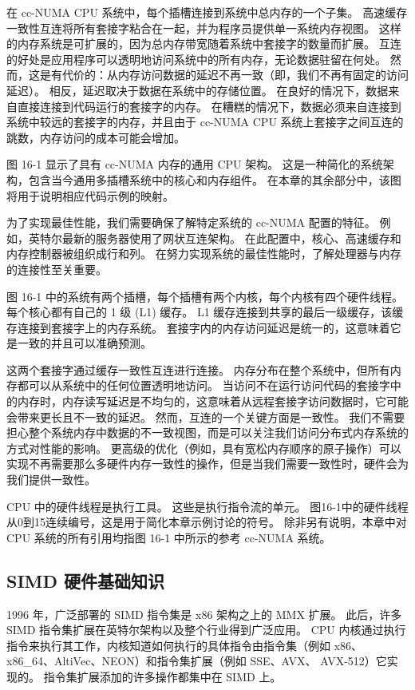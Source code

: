 在 cc-NUMA CPU 系统中，每个插槽连接到系统中总内存的一个子集。 高速缓存一致性互连将所有套接字粘合在一起，并为程序员提供单一系统内存视图。 这样的内存系统是可扩展的，因为总内存带宽随着系统中套接字的数量而扩展。 互连的好处是应用程序可以透明地访问系统中的所有内存，无论数据驻留在何处。 然而，这是有代价的：从内存访问数据的延迟不再一致（即，我们不再有固定的访问延迟）。 相反，延迟取决于数据在系统中的存储位置。 在良好的情况下，数据来自直接连接到代码运行的套接字的内存。 在糟糕的情况下，数据必须来自连接到系统中较远的套接字的内存，并且由于 cc-NUMA CPU 系统上套接字之间互连的跳数，内存访问的成本可能会增加。

图 16-1 显示了具有 cc-NUMA 内存的通用 CPU 架构。 这是一种简化的系统架构，包含当今通用多插槽系统中的核心和内存组件。 在本章的其余部分中，该图将用于说明相应代码示例的映射。

为了实现最佳性能，我们需要确保了解特定系统的 cc-NUMA 配置的特征。 例如，英特尔最新的服务器使用了网状互连架构。 在此配置中，核心、高速缓存和内存控制器被组织成行和列。 在努力实现系统的最佳性能时，了解处理器与内存的连接性至关重要。

图 16-1 中的系统有两个插槽，每个插槽有两个内核，每个内核有四个硬件线程。 每个核心都有自己的 1 级 (L1) 缓存。 L1 缓存连接到共享的最后一级缓存，该缓存连接到套接字上的内存系统。 套接字内的内存访问延迟是统一的，这意味着它是一致的并且可以准确预测。

这两个套接字通过缓存一致性互连进行连接。 内存分布在整个系统中，但所有内存都可以从系统中的任何位置透明地访问。 当访问不在运行访问代码的套接字中的内存时，内存读写延迟是不均匀的，这意味着从远程套接字访问数据时，它可能会带来更长且不一致的延迟。 然而，互连的一个关键方面是一致性。 我们不需要担心整个系统内存中数据的不一致视图，而是可以关注我们访问分布式内存系统的方式对性能的影响。 更高级的优化（例如，具有宽松内存顺序的原子操作）可以实现不再需要那么多硬件内存一致性的操作，但是当我们需要一致性时，硬件会为我们提供一致性。

CPU 中的硬件线程是执行工具。 这些是执行指令流的单元。 图16-1中的硬件线程从0到15连续编号，这是用于简化本章示例讨论的符号。 除非另有说明，本章中对 CPU 系统的所有引用均指图 16-1 中所示的参考 cc-NUMA 系统。

\subsection{SIMD 硬件基础知识}
1996 年，广泛部署的 SIMD 指令集是 x86 架构之上的 MMX 扩展。 此后，许多 SIMD 指令集扩展在英特尔架构以及整个行业得到广泛应用。 CPU 内核通过执行指令来执行其工作，内核知道如何执行的具体指令由指令集（例如 x86、x86\_64、AltiVec、NEON）和指令集扩展（例如 SSE、AVX、 AVX-512）它实现的。 指令集扩展添加的许多操作都集中在 SIMD 上。

